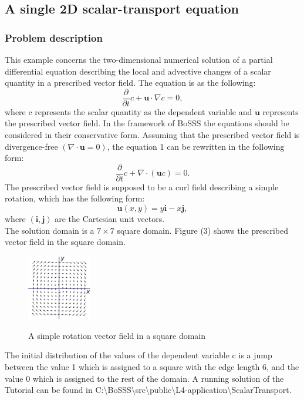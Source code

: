 \documentclass[11pt,twoside,a4paper]{fdyartcl}
\begin{document}
\subsection{A single 2D scalar-transport equation}
\subsubsection{Problem description} This example concerns the two-dimensional numerical solution of a partial differential equation describing the local and advective changes of a scalar quantity in a prescribed vector field. The equation is as the following:
\begin{equation}
\frac{\partial}{\partial t}c+\mathbf{u}\cdot \nabla c=0,
\end{equation}
where {\scriptsize c} represents the scalar quantity as the dependent variable and $\mathbf{u}$ represents the prescribed vector field. In the framework of BoSSS the equations should be considered in their conservative form. Assuming that the prescribed vector field is divergence-free $(\nabla \cdot \mathbf{u}=0)$, the equation 1 can be rewritten in the following form:
\begin{equation}
\frac{\partial}{\partial t}c+\nabla \cdot (\mathbf{u} c)=0.
\end{equation}
The prescribed vector field is supposed to be a curl field describing a simple rotation, which has the following form:
\begin{equation}
\mathbf{u}(x,y)=y\mathbf{i}-x\mathbf{j},
\end{equation}
where $(\mathbf{i},\mathbf{j})$ are the Cartesian unit vectors.\\
The solution domain is a $7\times 7$ square domain. Figure (3) shows the prescribed vector field in the square domain.
\begin{figure}[h] %
  \begin{centering}
  \includegraphics[width=0.25\textwidth]{Figures/curl}\\
  \end{centering}
  \caption{A simple rotation vector field in a square domain}
\end{figure}
The initial distribution of the values of the dependent variable {\scriptsize c} is a jump between the value 1 which is assigned to a square with the edge length 6, and the value 0 which is assigned to the rest of the domain.
A running solution of the Tutorial can be found in {\scriptsize C:\textbackslash BoSSS\textbackslash src\textbackslash public\textbackslash L4-application\textbackslash ScalarTransport}.
\end{document}
